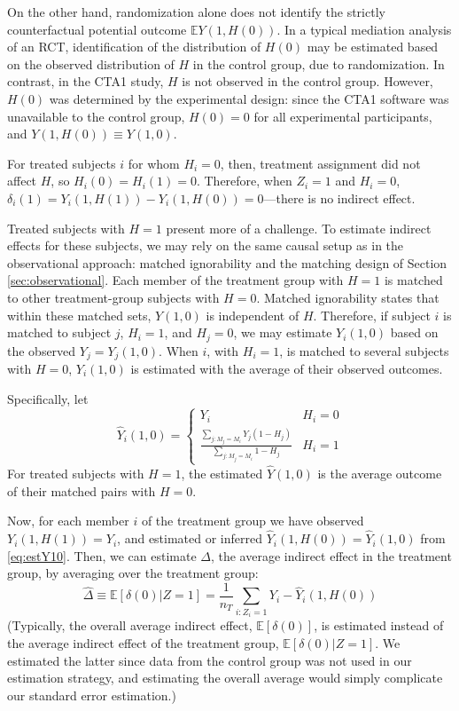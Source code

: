 \documentclass{article}\usepackage[]{graphicx}\usepackage[]{color}
\newcommand{\EE}{\mathbb{E}}
\begin{document}
On the other hand, randomization alone does not identify the strictly counterfactual
potential outcome $\EE Y(1,H(0))$.
In a typical mediation analysis of an RCT, identification of the
distribution of $H(0)$ may be estimated based on the observed
distribution of $H$ in the control group, due to randomization.
In contrast, in the CTA1 study, $H$ is not observed in the control
group.
However, $H(0)$ was determined by the experimental design: since the
CTA1 software was unavailable to the control group, $H(0)=0$ for all
experimental participants, and $Y(1,H(0))\equiv Y(1,0)$.

For treated subjects $i$ for whom $H_i=0$, then, treatment assignment
did not affect $H$, so $H_i(0)=H_i(1)=0$.
Therefore, when $Z_i=1$ and $H_i=0$,
$\delta_i(1)=Y_i(1,H(1))-Y_i(1,H(0))=0$---there is no
indirect effect.

Treated subjects with $H=1$ present more of a challenge.
To estimate indirect effects for these subjects, we may rely on the
same causal setup as in the observational approach:
matched ignorability and the matching design of Section
\ref{sec:observational}.
Each member of the treatment group with $H=1$ is matched to other
treatment-group subjects with $H=0$.
Matched ignorability states that within these matched sets, $Y(1,0)$
is independent of $H$.
Therefore, if subject $i$ is matched to subject $j$, $H_i=1$, and
$H_j=0$, we may estimate $Y_i(1,0)$ based on the observed
$Y_j=Y_j(1,0)$.
When $i$, with $H_i=1$, is matched to several subjects with $H=0$,
$Y_i(1,0)$ is estimated with the average of their observed outcomes.

Specifically, let
\begin{equation}\label{eq:estY10}
\hat{Y}_i(1,0)=\begin{cases}
 Y_i & H_i=0\\[3ex]
\frac{\displaystyle\sum_{j:M_j=M_i}
  Y_j(1-H_j)}{\displaystyle\sum_{j:M_j=M_i} 1-H_j} & H_i=1
\end{cases}
\end{equation}
For treated subjects with $H=1$, the estimated $\hat{Y}(1,0)$ is the
average outcome of their matched pairs with $H=0$.

Now, for each member $i$ of the treatment group we have observed
$Y_i(1,H(1))=Y_i$, and estimated or inferred
$\hat{Y}_i(1,H(0))=\hat{Y}_i(1,0)$ from \eqref{eq:estY10}.
Then, we can estimate $\Delta$, the average indirect effect in the
treatment group, by averaging over the treatment group:
\begin{equation*}
 \hat{\Delta}\equiv\widehat{\EE[\delta(0)|Z=1]}=\frac{1}{n_T}\displaystyle\sum_{i:Z_i=1} Y_i-\hat{Y}_i(1,H(0))
\end{equation*}
(Typically, the overall average indirect effect, $\EE[\delta(0)]$, is
estimated instead of the average indirect effect of the treatment
group, $\EE[\delta(0)|Z=1]$.
We estimated the latter since data from the control group was not used
in our estimation strategy, and estimating the overall average would
simply complicate our standard error estimation.)
\end{document}
